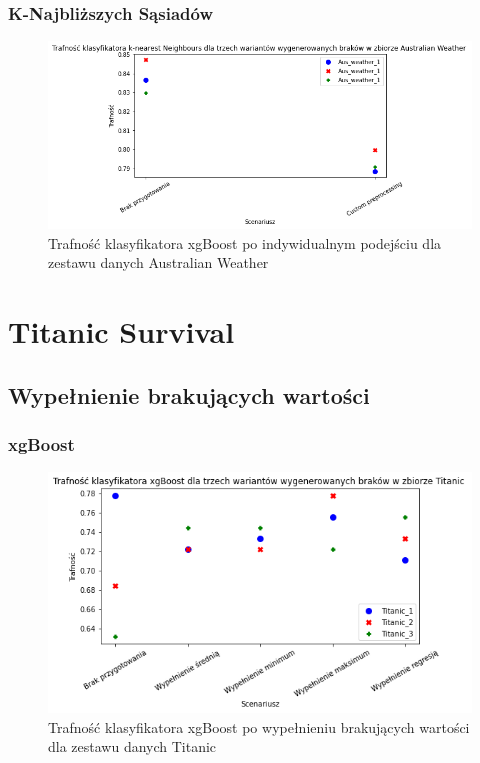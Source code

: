 \documentclass{book}
\begin{document}
\subsubsection{K-Najbliższych Sąsiadów}
\begin{figure}[H]
    \centerline{\includegraphics[scale=0.5]{Aus_Weather_knn_Custom}}
    \centering
    \caption{Trafność klasyfikatora xgBoost po indywidualnym podejściu dla zestawu danych Australian Weather}
    \end{figure}


\section{Titanic Survival}


\subsection{Wypełnienie brakujących wartości}
\subsubsection{xgBoost} 
\begin{figure}[H]
    \centerline{\includegraphics[scale=0.5]{Titanic_xgb_Wypełnienie_brakujących}}
    \centering
    \caption{Trafność klasyfikatora xgBoost po wypełnieniu brakujących wartości dla zestawu danych Titanic}
    \end{figure}
\end{document}
